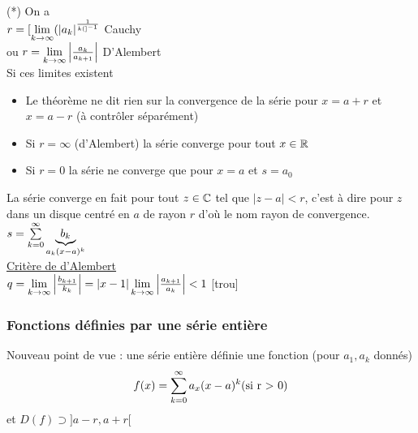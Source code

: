 \documentclass[12pt,a4paper]{article}
\begin{document}
{\begin{boite}
	\Theoreme (*) On a \\
	$r = [\lim\limits_{k\to\infty}(|a_k|^{\frac{1}{k(]^{-1}}}$ Cauchy\\
	ou $r = \lim\limits_{k\to\infty} \left|\frac{a_k}{a_{k+1}}\right|$ D’Alembert\\
	Si ces limites existent
\end{boite}
\begin{itemize}
	\item Le théorème ne dit rien sur la convergence de la série pour $x = a+r$ et $x=a-r$ (à contrôler séparément)
	\item Si $r = \infty$ (d'Alembert) la série converge pour tout $x\in\mathbb{R}$
	\item Si $r=0$ la série ne converge que pour $x = a$ et $s = a_0$
\end{itemize}
 La série converge en fait pour tout $z \in \mathbb{C}$ tel que $|z-a| <r$, c'est à dire pour $z$ dans un disque centré en $a$ de rayon $r$ d'où le nom rayon de convergence.\\
 $s = \sum\limits_{k=0}^{\infty}{\underbrace{b_k}_{a_k(x-a)^k}}$\\
\underline{Critère de d'Alembert}\\
$q = \lim\limits_{k\to\infty} \left|\frac{b_{k+1}}{k_k}\right| = |x-1|\lim\limits_{k\to\infty}\left|\frac{a_{k+1}}{a_k}\right| < 1$
[trou]
\subsubsection{Fonctions définies par une série entière}
\begin{boite}
Nouveau point de vue : une série entière définie une fonction (pour $a_1,a_k$ donnés)
\begin{equation}
	f(x) = \sum\limits_{k=0}^{\infty}{a_x(x-a)^k} (\text{si r $>$ 0})
\end{equation}
et $D(f) \supset ]a-r,a+r[$
\end{boite}
}
\end{document}

